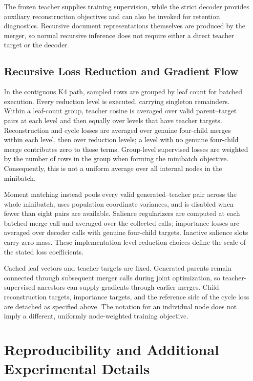 \documentclass[10pt]{article}
\begin{document}
The frozen teacher supplies training supervision, while the strict decoder provides auxiliary reconstruction objectives and can also be invoked for retention diagnostics. Recursive document representations themselves are produced by the merger, so normal recursive inference does not require either a direct teacher target or the decoder.

\subsection{Recursive Loss Reduction and Gradient Flow}
\label{app:loss-reduction}

In the contiguous K4 path, sampled rows are grouped by leaf count for batched
execution. Every reduction level is executed, carrying singleton remainders.
Within a leaf-count group, teacher cosine is averaged over valid parent--target
pairs at each level and then equally over levels that have teacher targets.
Reconstruction and cycle losses are averaged over genuine four-child merges
within each level, then over reduction levels; a level with no genuine
four-child merge contributes zero to those terms. Group-level supervised
losses are weighted by the number of rows in the group when forming the
minibatch objective. Consequently, this is not a uniform average over all
internal nodes in the minibatch.

Moment matching instead pools every valid generated--teacher pair across the
whole minibatch, uses population coordinate variances, and is disabled when
fewer than eight pairs are available. Salience regularizers are computed at
each batched merge call and averaged over the collected calls; importance
losses are averaged over decoder calls with genuine four-child targets.
Inactive salience slots carry zero mass. These implementation-level reduction
choices define the scale of the stated loss coefficients.

Cached leaf vectors and teacher targets are fixed. Generated parents remain
connected through subsequent merger calls during joint optimization, so
teacher-supervised ancestors can supply gradients through earlier merges.
Child reconstruction targets, importance targets, and the reference side of
the cycle loss are detached as specified above. The notation for an individual
node does not imply a different, uniformly node-weighted training objective.

\section{Reproducibility and Additional Experimental Details}
\label{app:reproducibility}
\end{document}

